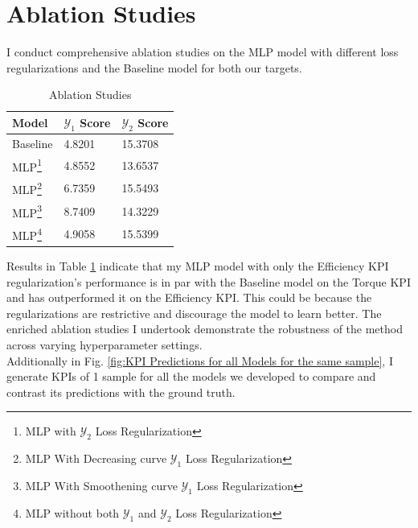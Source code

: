 \documentclass{report} %
\begin{document}
\section{Ablation Studies}\label{sec:Ablation Studies}

I conduct comprehensive ablation studies on the \ac{MLP} model with different loss regularizations and the Baseline model for both our targets.

\begin{minipage}[t]{\textwidth}
    \begin{table}[H]
        \centering
        \begin{tabular}{|p{}|p{}|p{}|}
        \hline {\bf Model} & {\bf $\mathcal{Y}_1$ Score} & {\bf $\mathcal{Y}_2$ Score}\\
        \hline 
        Baseline & 4.8201 & 15.3708 \\
        MLP\footnote{MLP with $\mathcal{Y}_2$ Loss Regularization} & 4.8552 & 13.6537  \\
        MLP\footnote{MLP With Decreasing curve $\mathcal{Y}_1$ Loss Regularization} & 6.7359 & 15.5493 \\
        MLP\footnote{MLP With Smoothening curve $\mathcal{Y}_1$ Loss Regularization} & 8.7409 & 14.3229 \\
        MLP\footnote{MLP without both $\mathcal{Y}_1$ and $\mathcal{Y}_2$ Loss Regularization} &  4.9058 & 15.5399  \\
        \hline
        \end{tabular}
        \caption{Ablation Studies}
        \label{tab:Ablation Studies}
    \end{table}
\end{minipage}

\vspace{1em} 

Results in Table \ref{tab:Ablation Studies} indicate that my \ac{MLP} model with only the Efficiency \ac{KPI} regularization's performance is in par with the 
Baseline model on the Torque \ac{KPI} and has outperformed it on the Efficiency \ac{KPI}. This could be because the regularizations are restrictive and discourage 
the model to learn better.
The enriched ablation studies I undertook demonstrate the robustness of the method across varying hyperparameter settings.\\

Additionally in Fig. \ref{fig:KPI Predictions for all Models for the same sample}, I generate \ac{KPI}s of 1 sample for all the models we developed to compare and contrast 
its predictions with the ground truth.\\
\end{document}
